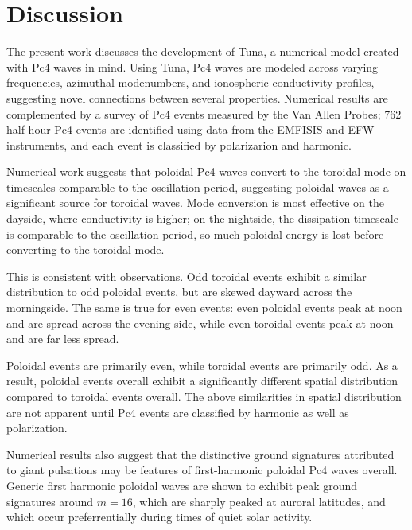 \documentclass[draft,linenumbers]{agujournal}
\begin{document}


\section{Discussion}

The present work discusses the development of Tuna, a numerical model created with Pc4 waves in mind. Using Tuna, Pc4 waves are modeled across varying frequencies, azimuthal modenumbers, and ionospheric conductivity profiles, suggesting novel connections between several properties. Numerical results are complemented by a survey of Pc4 events measured by the Van Allen Probes; 762 half-hour Pc4 events are identified using data from the EMFISIS and EFW instruments, and each event is classified by polarizarion and harmonic.


Numerical work suggests that poloidal Pc4 waves convert to the toroidal mode on timescales comparable to the oscillation period, suggesting poloidal waves as a significant source for toroidal waves. Mode conversion is most effective on the dayside, where conductivity is higher; on the nightside, the dissipation timescale is comparable to the oscillation period, so much poloidal energy is lost before converting to the toroidal mode.

This is consistent with observations. Odd toroidal events exhibit a similar distribution to odd poloidal events, but are skewed dayward across the morningside. The same is true for even events: even poloidal events peak at noon and are spread across the evening side, while even toroidal events peak at noon and are far less spread.

Poloidal events are primarily even, while toroidal events are primarily odd. As a result, poloidal events overall exhibit a significantly different spatial distribution compared to toroidal events overall. The above similarities in spatial distribution are not apparent until Pc4 events are classified by harmonic as well as polarization.


Numerical results also suggest that the distinctive ground signatures attributed to giant pulsations may be features of first-harmonic poloidal Pc4 waves overall. Generic first harmonic poloidal waves are shown to exhibit peak ground signatures around ${m = 16}$, which are sharply peaked at auroral latitudes, and which occur preferrentially during times of quiet solar activity.
\end{document}
